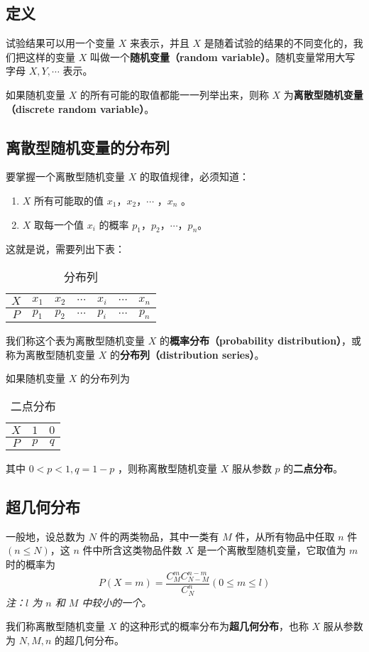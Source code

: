 

\subsection{定义}
试验结果可以用一个变量 $X$ 来表示，并且 $X$ 是随着试验的结果的不同变化的，我们把这样的变量 $X$ 叫做一个\textbf{随机变量（random variable）}。随机变量常用大写字母 $X,Y,\cdots$ 表示。

如果随机变量  $X$ 的所有可能的取值都能一一列举出来，则称 $X$ 为\textbf{离散型随机变量（discrete random variable）}。

\subsection{离散型随机变量的分布列}
要掌握一个离散型随机变量 $X$ 的取值规律，必须知道：
\begin{enumerate}
\item $X$ 所有可能取的值 $x_1$，$x_2$，$\cdots$ ，$x_n$ 。
\item $X$ 取每一个值 $x_i$ 的概率 $p_1$，$p_2$，$\cdots$，$p_n$。
\end{enumerate}
这就是说，需要列出下表：

\begin{table}[ht]
\centering
\caption{分布列}\label{HsDRV_tab1}
\begin{tabular}{|c|c|c|c|c|c|c|}
\hline
$X$ & $x_1$ & $x_2$ & $\cdots$ & $x_i$ & $\cdots$ & $x_n$ \\
\hline
$P$ & $p_1$ & $p_2$ & $\cdots$ & $p_i$ & $\cdots$ & $p_n$ \\
\hline
\end{tabular}
\end{table}
我们称这个表为离散型随机变量 $X$ 的\textbf{概率分布（probability distribution）}，或称为离散型随机变量 $X$ 的\textbf{分布列（distribution series）}。

如果随机变量 $X$ 的分布列为

\begin{table}[ht]
\centering
\caption{二点分布}\label{HsDRV_tab2}
\begin{tabular}{|c|c|c|}
\hline
$X$ & $1$ & $0$ \\
\hline
$P$ & $p$ & $q$ \\
\hline
\end{tabular}
\end{table}
其中 $0<p<1,q=1-p$ ，则称离散型随机变量 $X$ 服从参数 $p$ 的\textbf{二点分布}。

\subsection{超几何分布}
一般地，设总数为 $N$ 件的两类物品，其中一类有 $M$ 件，从所有物品中任取 $n$ 件 $(n\leqslant N)$，这 $n$ 件中所含这类物品件数 $X$ 是一个离散型随机变量，它取值为 $m$ 时的概率为
\begin{equation}
P(X=m) = \frac{C_M^mC_{N-M}^{n-m}}{C_N^n}(0\leqslant m\leqslant l)
\end{equation}
\textsl{注：$l$ 为 $n$ 和 $M$ 中较小的一个。}

我们称离散型随机变量 $X$ 的这种形式的概率分布为\textbf{超几何分布}，也称 $X$ 服从参数为 $N,M,n$ 的超几何分布。